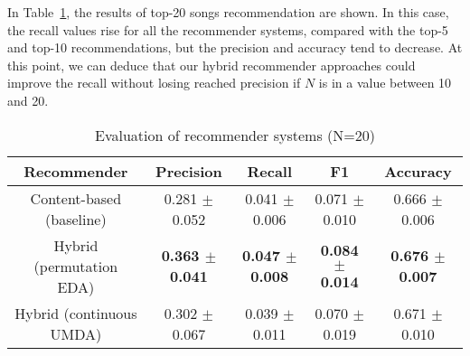 In Table~\ref{table:recn20}, the results of top-20 songs recommendation are shown. In this case, the recall values rise for all the recommender systems, compared with the top-5 and top-10 recommendations, but the precision and accuracy tend to decrease. At this point, we can deduce that our hybrid recommender approaches could improve the recall without losing reached precision if $N$ is in a value between 10 and 20.
\begin{table}[h!]
	\caption{Evaluation of recommender systems (N=20)} %
	\centering %
	\begin{adjustbox}{max width=\textwidth}
		\begin{tabular}{c c c c c} %
			\hline\hline %
			Recommender & Precision & Recall & F1 & Accuracy \\ [0.5ex] %
			\hline %
			Content-based (baseline) & 0.281 $\pm$ 0.052 & 0.041 $\pm$ 0.006 & 0.071 $\pm$ 0.010 & 0.666 $\pm$ 0.006 \\ %
			Hybrid (permutation EDA) & \textbf{0.363 $\pm$ 0.041} & \textbf{0.047 $\pm$ 0.008} & \textbf{0.084 $\pm$ 0.014} & \textbf{0.676  $\pm$ 0.007} \\
			Hybrid (continuous UMDA) & 0.302 $\pm$ 0.067 & 0.039 $\pm$ 0.011 & 0.070 $\pm$ 0.019 & 0.671 $\pm$ 0.010 \\ [1ex] %
			\hline %
		\end{tabular}
	\end{adjustbox}
	\label{table:recn20} %
\end{table}
